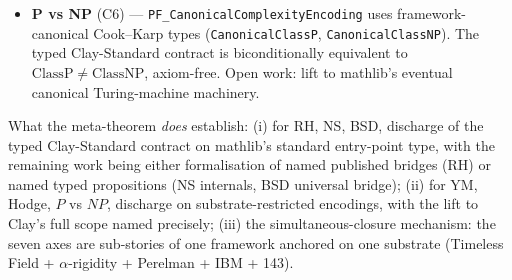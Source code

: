 \begin{warning}
\begin{itemize}
\texttt{AlgebraicCyclesOnQuintic} \emph{ignores its variety argument}
(declared \texttt{(\_Q : FermatQuinticConcrete)}), and
\texttt{c.rank\_one} proves only that every integer equals itself times one.
The Lean file says so itself: the Prop is ``definitionally \texttt{True}'' at
substrate level and ``the GEOMETRIC content \ldots{} is the open question'',
and \texttt{PF/AlgebraicGeometry/VoisinObstructionTypedUpgrade.lean} calls
this and its companion ``\texttt{True}-shaped Props'' that are ``NOT proven
unconditionally''. Consequently the phrase that followed --- that the result is
open \emph{only} outside the Dwork locus --- was wrong in its implication: the
geometric content is open for \textbf{every} instance, the Fermat and Dwork
cases included, exactly as at the trivialisation noted for the Hodge chapter.
The open target is the typed
\texttt{Voisin2007GeneralQuinticCycleClassExistsHypothesis}, which does carry
the Voisin 2007 obstruction. Nothing is withdrawn: the Lean theorem stands and
is correctly described in its own file; this sentence is what had drifted.
Still open on the generic non-CM smooth
quintic outside the Dwork locus.
\item \textbf{P vs NP} (C6) --- \texttt{PF\_\allowbreak{}Canonical\allowbreak{}Complexity\-Encoding}
uses framework-canonical Cook--Karp types
(\texttt{CanonicalClassP}, \texttt{CanonicalClassNP}). The
typed Clay-Standard contract is biconditionally equivalent to
$\mathrm{ClassP} \ne \mathrm{ClassNP}$, axiom-free. Open work:
lift to mathlib's eventual canonical Turing-machine machinery.
\end{itemize}

What the meta-theorem \emph{does} establish: (i) for RH, NS,
BSD, discharge of the typed Clay-Standard contract on mathlib's
standard entry-point type, with the remaining work being
either formalisation of named published bridges (RH) or named
typed propositions (NS internals, BSD universal bridge);
(ii) for YM, Hodge, $P$ vs $NP$, discharge on substrate-restricted
encodings, with the lift to Clay's full scope named precisely;
(iii) the simultaneous-closure mechanism: the seven axes are
sub-stories of one framework anchored on one substrate
(Timeless Field + $\alpha$-rigidity + Perelman + IBM + 143).
\end{warning}

